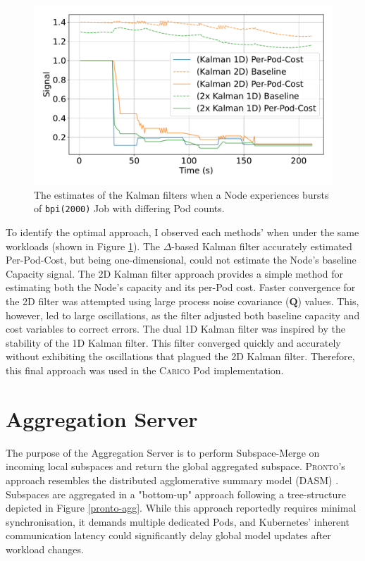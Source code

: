 \begin{figure}[ht!]
    \centering
    \includegraphics[width=\textwidth]{images/filter-comparison.pdf}
    \caption{The estimates of the Kalman filters when a Node experiences bursts
    of \texttt{bpi(2000)} Job with differing Pod counts.}
    \label{fig:filter-evaluation}
\end{figure}

To identify the optimal approach, I observed each methods' when under the same
workloads (shown in Figure \ref{fig:filter-evaluation}). The $\Delta$-based
Kalman filter accurately estimated Per-Pod-Cost, but being one-dimensional,
could not estimate the Node's baseline Capacity signal. The 2D Kalman filter
approach provides a simple method for estimating both the Node's capacity and
its per-Pod cost. Faster convergence for the 2D filter was attempted using large
process noise covariance ($\mathbf{Q}$) values. This, however, led to large
oscillations, as the filter adjusted both baseline capacity and cost variables
to correct errors. The dual 1D Kalman filter was inspired by the stability of
the 1D Kalman filter. This filter converged quickly and accurately without
exhibiting the oscillations that plagued the 2D Kalman filter. Therefore, this
final approach was used in the \textsc{Carico} Pod implementation.

\section{Aggregation Server}
The purpose of the Aggregation Server is to perform Subspace-Merge on incoming
local subspaces and return the global aggregated subspace. \textsc{Pronto}'s
approach resembles the distributed agglomerative summary model (DASM) \cite{tanenbaum2002distributed}.
Subspaces are aggregated in a "bottom-up" approach following a tree-structure
depicted in Figure \ref{pronto-agg}. While this approach reportedly requires
minimal synchronisation, it demands multiple dedicated Pods, and Kubernetes'
inherent communication latency could significantly delay global model updates
after workload changes.

